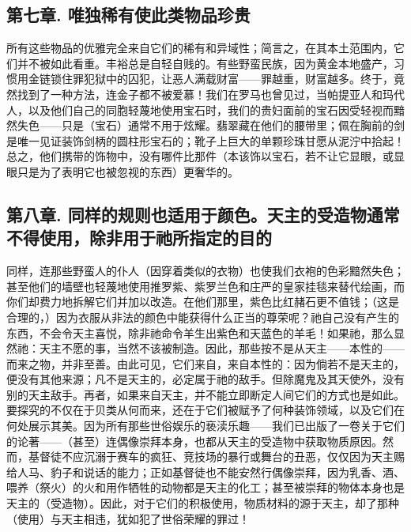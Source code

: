 
\subsection{第七章. 唯独稀有使此类物品珍贵}

所有这些物品的优雅完全来自它们的稀有和异域性；简言之，在其本土范围内，它们并不被如此看重。丰裕总是自轻自贱的。有些野蛮民族，因为黄金本地盛产，习惯用金链锁住罪犯狱中的囚犯，让恶人满载财富——罪越重，财富越多。终于，竟然找到了一种方法，连金子都不被爱慕！我们在罗马也曾见过，当帕提亚人和玛代人，以及他们自己的同胞轻蔑地使用宝石时，我们的贵妇面前的宝石因受轻视而黯然失色——只是（宝石）通常不用于炫耀。翡翠藏在他们的腰带里；佩在胸前的剑是唯一见证装饰剑柄的圆柱形宝石的；靴子上巨大的单颗珍珠甘愿从泥泞中拾起！总之，他们携带的饰物中，没有哪件比那件（本该饰以宝石，若不让它显眼，或显眼只是为了表明它也被忽视的东西）更奢华的。\par


\subsection{第八章. 同样的规则也适用于颜色。天主的受造物通常不得使用，除非用于祂所指定的目的}

同样，连那些野蛮人的仆人（因穿着类似的衣物）也使我们衣袍的色彩黯然失色；甚至他们的墙壁也轻蔑地使用推罗紫、紫罗兰色和庄严的皇家挂毯来替代绘画，而你们却费力地拆解它们并加以改造。在他们那里，紫色比红赭石更不值钱；（这是合理的，）因为衣服从非法的颜色中能获得什么正当的尊荣呢？祂自己没有产生的东西，不会令天主喜悦，除非祂命令羊生出紫色和天蓝色的羊毛！如果祂，那么显然祂：天主不愿的事，当然不该被制造。因此，那些按不是从天主——本性的——而来之物，并非至善。由此可见，它们来自，来自本性的：因为倘若不是天主的，便没有其他来源；凡不是天主的，必定属于祂的敌手。但除魔鬼及其天使外，没有别的天主敌手。再者，如果来自天主，并不能立即断定人间它们的方式也是如此。要探究的不仅在于贝类从何而来，还在于它们被赋予了何种装饰领域，以及它们在何处展示其美。因为所有那些世俗娱乐的亵渎乐趣——我们已出版了一卷关于它们的论著——（甚至）连偶像崇拜本身，也都从天主的受造物中获取物质原因。然而，基督徒不应沉溺于赛车的疯狂、竞技场的暴行或舞台的丑恶，仅仅因为天主赐给人马、豹子和说话的能力；正如基督徒也不能安然行偶像崇拜，因为乳香、酒、喂养（祭火）的火和用作牺牲的动物都是天主的化工；甚至被崇拜的物体本身也是天主的（受造物）。因此，对于它们的积极使用，物质材料的源于天主，却了那种（使用）与天主相违，犹如犯了世俗荣耀的罪过！\par

